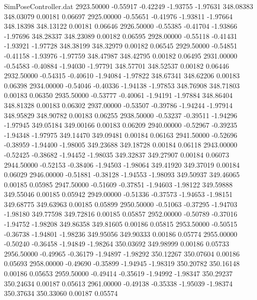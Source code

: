 \begin{filecontents}{SimPoseController.dat}
2923.50000   -0.55917   -0.42249    -1.93755   -1.97631  348.08383  348.03079    0.00181    0.06697
2925.00000   -0.55651   -0.41976    -1.93811   -1.97664  348.18398  348.13122    0.00181    0.06646
2926.50000   -0.55385   -0.41704    -1.93866   -1.97696  348.28337  348.23089    0.00182    0.06595
2928.00000   -0.55118   -0.41431    -1.93921   -1.97728  348.38199  348.32979    0.00182    0.06545
2929.50000   -0.54851   -0.41158    -1.93976   -1.97759  348.47987  348.42795    0.00182    0.06495
2931.00000   -0.54583   -0.40884    -1.94030   -1.97791  348.57701  348.52537    0.00182    0.06446
2932.50000   -0.54315   -0.40610    -1.94084   -1.97822  348.67341  348.62206    0.00183    0.06398
2934.00000   -0.54046   -0.40336    -1.94138   -1.97853  348.76908  348.71803    0.00183    0.06350
2935.50000   -0.53777   -0.40061    -1.94191   -1.97884  348.86404  348.81328    0.00183    0.06302
2937.00000   -0.53507   -0.39786    -1.94244   -1.97914  348.95829  348.90782    0.00183    0.06255
2938.50000   -0.53237   -0.39511    -1.94296   -1.97945  349.05184  349.00166    0.00183    0.06209
2940.00000   -0.52967   -0.39235    -1.94348   -1.97975  349.14470  349.09481    0.00184    0.06163
2941.50000   -0.52696   -0.38959    -1.94400   -1.98005  349.23688  349.18728    0.00184    0.06118
2943.00000   -0.52425   -0.38682    -1.94452   -1.98035  349.32837  349.27907    0.00184    0.06073
2944.50000   -0.52153   -0.38406    -1.94503   -1.98064  349.41920  349.37019    0.00184    0.06029
2946.00000   -0.51881   -0.38128    -1.94553   -1.98093  349.50937  349.46065    0.00185    0.05985
2947.50000   -0.51609   -0.37851    -1.94603   -1.98122  349.59888  349.55046    0.00185    0.05942
2949.00000   -0.51336   -0.37573    -1.94653   -1.98151  349.68775  349.63963    0.00185    0.05899
2950.50000   -0.51063   -0.37295    -1.94703   -1.98180  349.77598  349.72816    0.00185    0.05857
2952.00000   -0.50789   -0.37016    -1.94752   -1.98208  349.86358  349.81605    0.00186    0.05815
2953.50000   -0.50515   -0.36738    -1.94801   -1.98236  349.95056  349.90333    0.00186    0.05774
2955.00000   -0.50240   -0.36458    -1.94849   -1.98264  350.03692  349.98999    0.00186    0.05733
2956.50000   -0.49965   -0.36179    -1.94897   -1.98292  350.12267  350.07604    0.00186    0.05693
2958.00000   -0.49690   -0.35899    -1.94945   -1.98319  350.20782  350.16148    0.00186    0.05653
2959.50000   -0.49414   -0.35619    -1.94992   -1.98347  350.29237  350.24634    0.00187    0.05613
2961.00000   -0.49138   -0.35338    -1.95039   -1.98374  350.37634  350.33060    0.00187    0.05574

\end{filecontents}
